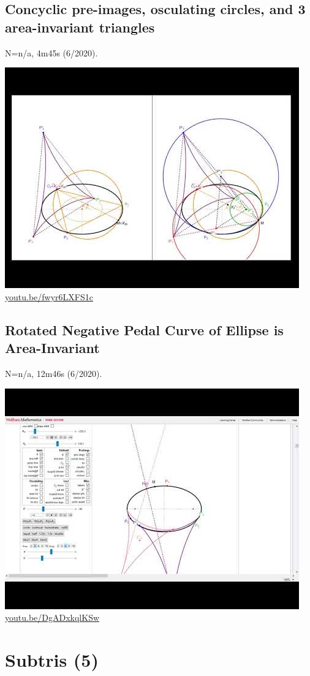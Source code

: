 \documentclass[12pt]{amsart}
\begin{document}
\subsection{Concyclic pre-images, osculating circles, and 3 area-invariant triangles}
\label{vid:fwyr6LXFS1c}
\noindent N=n/a, 4m45s (6/2020). 
\begin{center}\includegraphics[width=.5\textwidth]{pics/fwyr6LXFS1c.jpg} \\ 
\href{https://youtu.be/fwyr6LXFS1c}{\url{youtu.be/fwyr6LXFS1c}}\end{center}
% 
\subsection{Rotated Negative Pedal Curve of Ellipse is Area-Invariant}
\label{vid:DgADxkqlKSw}
\noindent N=n/a, 12m46s (6/2020). 
\begin{center}\includegraphics[width=.5\textwidth]{pics/DgADxkqlKSw.jpg} \\ 
\href{https://youtu.be/DgADxkqlKSw}{\url{youtu.be/DgADxkqlKSw}}\end{center}
% 

\section{Subtris (5)}
\end{document}
